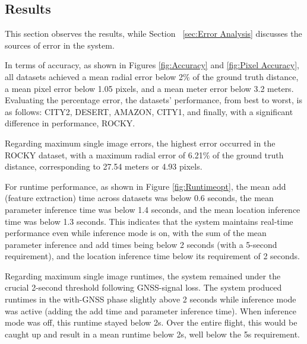 \subsection{Results}


This section observes the results, while Section ~\ref{sec:Error Analysis} discusses the sources of error in the system.

In terms of accuracy, as shown in Figures \ref{fig:Accuracy} and \ref{fig:Pixel Accuracy}, all datasets achieved a mean radial error below 2\% of the ground truth distance, a mean pixel error below 1.05 pixels, and a mean meter error below 3.2 meters. Evaluating the percentage error, the datasets' performance, from best to worst, is as follows: CITY2, DESERT, AMAZON, CITY1, and finally, with a significant difference in performance, ROCKY.

Regarding maximum single image errors, the highest error occurred in the ROCKY dataset, with a maximum radial error of 6.21\% of the ground truth distance, corresponding to 27.54 meters or 4.93 pixels.

For runtime performance, as shown in Figure \ref{fig:Runtimeopt}, the mean add (feature extraction) time across datasets was below 0.6 seconds, the mean parameter inference time was below 1.4 seconds, and the mean location inference time was below 1.3 seconds. This indicates that the system maintains real-time performance even while inference mode is on, with the sum of the mean parameter inference and add times being below 2 seconds (with a 5-second requirement), and the location inference time below its requirement of 2 seconds.

Regarding maximum single image runtimes, the system remained under the crucial 2-second threshold following GNSS-signal loss. The system produced runtimes in the with-GNSS phase slightly above 2 seconds while inference mode was active (adding the add time and parameter inference time). When inference mode was off, this runtime stayed below 2s. Over the entire flight, this would be caught up and result in a mean runtime below 2s, well below the 5s requirement. 

